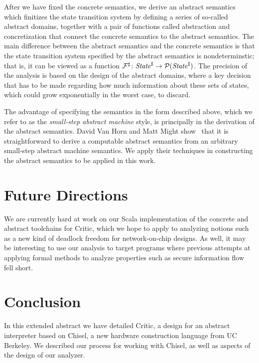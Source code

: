 \documentclass[10pt,conference]{IEEEtran}
\begin{document}
After we have fixed the concrete semantics,
we derive an abstract semantics which finitizes the state transition system
by defining a series of so-called abstract domains, together with a pair of functions
called abstraction and concretization that connect the concrete semantics to the abstract
semantics. The main difference between the abstract semantics and the concrete semantics is that
the state transition system specified by the abstract semantics is nondeterminstic; that is, it
can be viewed as a function $\mathcal F^\sharp\colon \mathit{State}^\sharp\to\mathcal P(\mathit{State}^\sharp)$. The precision of the
analysis is based on the design of the abstract domains, where a key decision that has to be made
regarding how much information about these sets of states, which could grow exponentially in the worst
case, to discard.

The advantage of specifying the semantics in the form 
described above, which we refer to as the \emph{small-step abstract machine} style,
is principally in the derivation of the abstract semantics. David Van Horn and Matt Might
show~\cite{vanhorn10} that it is straightforward to derive a computable abstract semantics
from an arbitrary small-step abstract machine semantics. We apply their techniques in
constructing the abstract semantics to be applied in this work.

\section{Future Directions}

We are currently hard at work on our Scala implementation of the concrete and abstract
toolchains for Critic, which we hope to apply to analyzing notions such as a new kind of
deadlock freedom for network-on-chip designs. As well, it may be interesting to use our
analysis to target programs where previous attempts at applying formal methods to analyze
properties such as secure information flow fell short.

\section{Conclusion}

In this extended abstract we have detailed Critic, a design for an abstract interpreter
based on Chisel, a new hardware construction language from UC Berkeley. We described
our process for working with Chisel, as well as aspects of the design of our analyzer.

\end{document}
